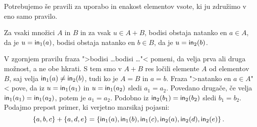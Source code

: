 Potrebujemo še pravili za uporabo in enakost elementov vsote, ki ju združimo v eno samo
pravilo.

\begin{pravilo}
  \label{vsota:uporaba}
  Za vsaki množici $A$ in $B$ in za vsak $u \in A + B$, bodisi obstaja natanko en
  $a \in A$, da je $u = \mathsf{in}_{1}(a)$, bodisi obstaja natanko en $b \in B$, da je
  $u = \mathsf{in}_{2}(b)$.
\end{pravilo}

V zgornjem pravilu fraza ">bodisi \dots bodisi \dots"< pomeni, da velja prva ali druga možnost, a ne obe hkrati.
%
S tem smo v $A + B$ res ločili elemente $A$ od elementov $B$, saj velja $\mathsf{in}_{1}(a) \neq \mathsf{in}_{2}(b)$, tudi ko je $A = B$ in $a = b$. 
%
Fraza ">natanko en $a \in A$"< pove, da iz $u = \mathsf{in}_{1}(a_1)$ in $u = \mathsf{in}_{1}(a_2)$ sledi $a_1 = a_2$.
Povedano drugače, če velja $\mathsf{in}_{1}(a_1) = \mathsf{in}_{1}(a_2)$, potem je $a_1 = a_2$. Podobno iz
$\mathsf{in}_{2}(b_1) = \mathsf{in}_{2}(b_2)$ sledi $b_1 = b_2$.
%
Podajmo prepost primer, ki verjetno marsikaj pojasni:
%
\begin{equation*}
  \left\{a, b, c\right\} + \left\{a, d, e\right\} =
  \left\{\mathsf{in}_{1}(a), \mathsf{in}_{1}(b), \mathsf{in}_{1}(c), \mathsf{in}_{2}(a), \mathsf{in}_{2}(d), \mathsf{in}_{2}(e)\right\}.
\end{equation*}

